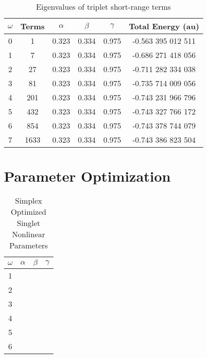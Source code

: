 \documentclass[Dissertation.tex]{subfiles}
\begin{document}
\setlength{\abovecaptionskip}{6pt}   %
\setlength{\belowcaptionskip}{6pt}   %
\begin{table}[H]
\centering
\begin{tabular}{c c c c c c}
\toprule
$\omega$ & Terms & $\alpha$ & $\beta$ & $\gamma$ & Total Energy (au) \\ [0.5ex]
\midrule
0 & 1 & 0.323 & 0.334 & 0.975 & -0.563 395 012 511 \\
1 & 7 & 0.323 & 0.334 & 0.975 & -0.686 271 418 056 \\
2 & 27 & 0.323 & 0.334 & 0.975 & -0.711 282 334 038 \\
3 & 81 & 0.323 & 0.334 & 0.975 & -0.735 714 009 056 \\
4 & 201 & 0.323 & 0.334 & 0.975 & -0.743 231 966 796 \\
5 & 432 & 0.323 & 0.334 & 0.975 & -0.743 327 766 172 \\
6 & 854 & 0.323 & 0.334 & 0.975 & -0.743 378 744 079 \\
7 & 1633 & 0.323 & 0.334 & 0.975 & -0.743 386 823 504 \\
\bottomrule
\end{tabular}
\caption{Eigenvalues of triplet short-range terms} %
\label{tab:BoundEnergyTodd3}
\end{table}

\section{Parameter Optimization}
\label{sec:BoundOptimization}


\setlength{\abovecaptionskip}{6pt}   %
\setlength{\belowcaptionskip}{6pt}   %
\begin{table}[ht]
\caption{Simplex Optimized Singlet Nonlinear Parameters} %
\centering
\begin{tabular}{c c c c}
\hline\hline
$\omega$ & $\alpha$ & $\beta$ & $\gamma$ \\ [0.5ex]
\hline
1 &  &  &  \\
2 &  &  &  \\
3 &  &  &  \\
4 &  &  &  \\
5 &  &  &  \\
6 &  &  &  \\
\hline\hline
\end{tabular}
\label{table:NonlinearOptimized1SSimplex}
\end{table}
\end{document}
